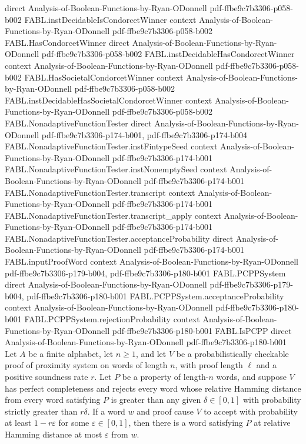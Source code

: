 \begin{theorem}
  {direct}
  {Analysis-of-Boolean-Functions-by-Ryan-ODonnell}
  {pdf-ffbe9c7b3306-p058-b002}
\proofstep
  {FABL.instDecidableIsCondorcetWinner}
  {context}
  {Analysis-of-Boolean-Functions-by-Ryan-ODonnell}
  {pdf-ffbe9c7b3306-p058-b002}
\proofstep
  {FABL.HasCondorcetWinner}
  {direct}
  {Analysis-of-Boolean-Functions-by-Ryan-ODonnell}
  {pdf-ffbe9c7b3306-p058-b002}
\proofstep
  {FABL.instDecidableHasCondorcetWinner}
  {context}
  {Analysis-of-Boolean-Functions-by-Ryan-ODonnell}
  {pdf-ffbe9c7b3306-p058-b002}
\proofstep
  {FABL.HasSocietalCondorcetWinner}
  {context}
  {Analysis-of-Boolean-Functions-by-Ryan-ODonnell}
  {pdf-ffbe9c7b3306-p058-b002}
\proofstep
  {FABL.instDecidableHasSocietalCondorcetWinner}
  {context}
  {Analysis-of-Boolean-Functions-by-Ryan-ODonnell}
  {pdf-ffbe9c7b3306-p058-b002}
\proofstep
  {FABL.NonadaptiveFunctionTester}
  {direct}
  {Analysis-of-Boolean-Functions-by-Ryan-ODonnell}
  {pdf-ffbe9c7b3306-p174-b001,
    pdf-ffbe9c7b3306-p174-b004}
\proofstep
  {FABL.NonadaptiveFunctionTester.instFintypeSeed}
  {context}
  {Analysis-of-Boolean-Functions-by-Ryan-ODonnell}
  {pdf-ffbe9c7b3306-p174-b001}
\proofstep
  {FABL.NonadaptiveFunctionTester.instNonemptySeed}
  {context}
  {Analysis-of-Boolean-Functions-by-Ryan-ODonnell}
  {pdf-ffbe9c7b3306-p174-b001}
\proofstep
  {FABL.NonadaptiveFunctionTester.transcript}
  {context}
  {Analysis-of-Boolean-Functions-by-Ryan-ODonnell}
  {pdf-ffbe9c7b3306-p174-b001}
\proofstep
  {FABL.NonadaptiveFunctionTester.transcript_apply}
  {context}
  {Analysis-of-Boolean-Functions-by-Ryan-ODonnell}
  {pdf-ffbe9c7b3306-p174-b001}
\proofstep
  {FABL.NonadaptiveFunctionTester.acceptanceProbability}
  {direct}
  {Analysis-of-Boolean-Functions-by-Ryan-ODonnell}
  {pdf-ffbe9c7b3306-p174-b001}
\proofstep
  {FABL.inputProofWord}
  {context}
  {Analysis-of-Boolean-Functions-by-Ryan-ODonnell}
  {pdf-ffbe9c7b3306-p179-b004,
    pdf-ffbe9c7b3306-p180-b001}
\proofstep
  {FABL.PCPPSystem}
  {direct}
  {Analysis-of-Boolean-Functions-by-Ryan-ODonnell}
  {pdf-ffbe9c7b3306-p179-b004,
    pdf-ffbe9c7b3306-p180-b001}
\proofstep
  {FABL.PCPPSystem.acceptanceProbability}
  {context}
  {Analysis-of-Boolean-Functions-by-Ryan-ODonnell}
  {pdf-ffbe9c7b3306-p180-b001}
\proofstep
  {FABL.PCPPSystem.rejectionProbability}
  {context}
  {Analysis-of-Boolean-Functions-by-Ryan-ODonnell}
  {pdf-ffbe9c7b3306-p180-b001}
\proofstep
  {FABL.IsPCPP}
  {direct}
  {Analysis-of-Boolean-Functions-by-Ryan-ODonnell}
  {pdf-ffbe9c7b3306-p180-b001}
Let $A$ be a finite alphabet, let $n\ge1$, and let $V$ be a probabilistically checkable
proof of proximity system on words of length $n$, with proof length $\ell$ and a
positive soundness rate $r$. Let $P$ be a property of length-$n$ words, and suppose $V$
has perfect completeness and rejects every word whose relative Hamming distance from
every word satisfying $P$ is greater than any given $\delta\in[0,1]$ with probability
strictly greater than $r\delta$. If a word $w$ and proof cause $V$ to accept with
probability at least $1-r\varepsilon$ for some $\varepsilon\in[0,1]$, then there is a
word satisfying $P$ at relative Hamming distance at most $\varepsilon$ from $w$.
\end{theorem}

